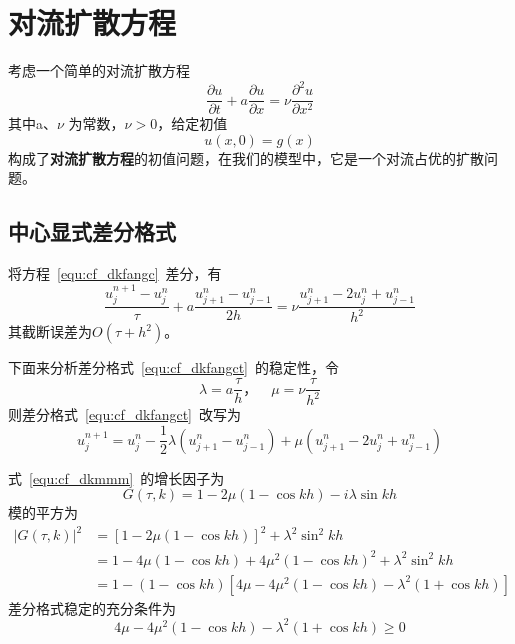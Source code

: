 \section{对流扩散方程}
考虑一个简单的对流扩散方程
\begin{equation}\label{equ:cf_dkfangc}
	\dfrac{\partial u}{\partial t}+a\dfrac{\partial u}{\partial x}=\nu\dfrac{\partial^2 u}{\partial x^2}
\end{equation}
其中a、$\nu$ 为常数，$\nu>0$，给定初值
\begin{equation}
	u(x,0)=g(x)
\end{equation}
构成了\textbf{对流扩散方程}的初值问题，在我们的模型中，它是一个对流占优的扩散问题。\par
\subsection{中心显式差分格式}
将方程~\eqref{equ:cf_dkfangc}~差分，有
\begin{equation}\label{equ:cf_dkfangct}
	\dfrac{u^{n+1}_j-u^{n}_{j}}{\tau}+a\dfrac{u^{n}_{j+1}-u^n_{j-1}}{2h}=\nu\dfrac{u^n_{j+1}-2u^n_j+u^n_{j-1}}{h^2}
\end{equation}
其截断误差为$O(\tau+h^2)$。\par
下面来分析差分格式~\eqref{equ:cf_dkfangct}~的稳定性，令
\begin{equation}
	\lambda = a\dfrac{\tau}{h}，\quad\mu=\nu\dfrac{\tau}{h^2}
\end{equation}
则差分格式~\eqref{equ:cf_dkfangct}~改写为
\begin{equation}\label{equ:cf_dkmmm}
u^{n+1}_j=u^n_j-\frac{1}{2}\lambda(u^n_{j+1}-u^n_{j-1})+\mu(u^n_{j+1}-2u^n_j+u^n_{j-1})
\end{equation}\par
式~\eqref{equ:cf_dkmmm}~的增长因子为
\begin{equation}
	G(\tau,k)=1-2\mu(1-\cos kh)-i\lambda\sin kh
\end{equation}
模的平方为
\begin{equation}
\begin{aligned}
	|G(\tau,k)|^2 &= [1-2\mu(1-\cos kh)]^2+\lambda^2\sin^2 kh\\
				  &= 1-4\mu(1-\cos kh)+4\mu^2(1-\cos kh)^2+\lambda^2\sin^2 kh\\
				  &= 1-(1-\cos kh)[4\mu-4\mu^2(1-\cos kh)-\lambda^2(1+\cos kh)]
\end{aligned}				  
\end{equation}
差分格式稳定的充分条件为
\begin{equation}
4\mu-4\mu^2(1-\cos kh)-\lambda^2(1+\cos kh) \geq 0
\end{equation}
